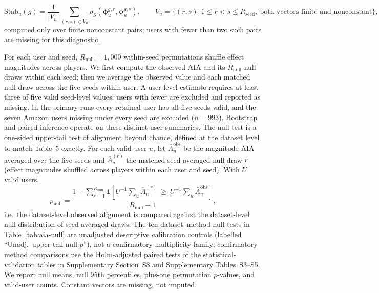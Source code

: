 \documentclass[a4paper,fleqn,doubleblind]{cas-sc}
\begin{document}
\begin{equation}
\mathrm{Stab}_u(g)=\frac{1}{|V_u|}\sum_{(r,s)\in V_u}\rho_S(\boldsymbol\phi_{u}^{g,r},\boldsymbol\phi_{u}^{g,s}),\qquad V_u=\{(r,s):1\le r<s\le R_{\mathrm{seed}},\ \text{both vectors finite and nonconstant}\},
\end{equation}
computed only over finite nonconstant pairs; users with fewer than two such pairs are missing for this diagnostic.

For each user and seed, $R_{\mathrm{null}}=1{,}000$ within-seed permutations shuffle effect magnitudes across players. We first compute the observed AIA and its $R_{\mathrm{null}}$ null draws within each seed; then we average the observed value and each matched null draw across the five seeds within user. A user-level estimate requires at least three of five valid seed-level values; users with fewer are excluded and reported as missing. In the primary runs every retained user has all five seeds valid, and the seven Amazon users missing under every seed are excluded ($n=993$). Bootstrap and paired inference operate on these distinct-user summaries. The null test is a one-sided upper-tail test of alignment beyond chance, defined at the dataset level to match Table~5 exactly. For each valid user $u$, let $\bar A_u^{\mathrm{obs}}$ be the magnitude AIA averaged over the five seeds and $\bar A_u^{(r)}$ the matched seed-averaged null draw $r$ (effect magnitudes shuffled across players within each user and seed). With $U$ valid users,
\begin{equation}
p_{\mathrm{null}}=
\frac{1+\sum_{r=1}^{R_{\mathrm{null}}}\mathbf{1}\left[U^{-1}\textstyle\sum_u \bar A_u^{(r)}\ \ge\ U^{-1}\textstyle\sum_u \bar A_u^{\mathrm{obs}}\right]}{R_{\mathrm{null}}+1},
\label{eq:null-p}
\end{equation}
i.e.\ the dataset-level observed alignment is compared against the dataset-level null distribution of seed-averaged draws. The ten dataset--method null tests in Table~\ref{tab:aia-null} are unadjusted descriptive calibration controls (labelled ``Unadj.\ upper-tail null $p$''), not a confirmatory multiplicity family; confirmatory method comparisons use the Holm-adjusted paired tests of the statistical-validation tables in Supplementary Section~S8 and Supplementary Tables~S3--S5. We report null means, null 95th percentiles, plus-one permutation $p$-values, and valid-user counts. Constant vectors are missing, not imputed.

\FloatBarrier
\end{document}
